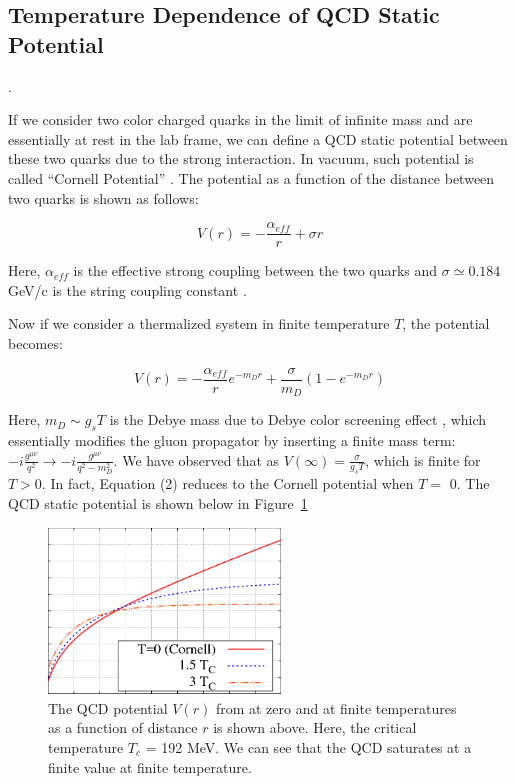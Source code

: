 \subsection{Temperature Dependence of QCD Static Potential}. 

If we consider two color charged quarks in the limit of infinite mass and are essentially at rest in the lab frame, we can define a QCD static potential between these two quarks due to the strong interaction. In vacuum, such potential is called ``Cornell Potential'' \cite{Cornell}. The potential as a function of the distance between two quarks is shown as follows:

\begin{equation}
V(r) = -\frac{\alpha_{eff}}{r} + \sigma r
\end{equation}

Here, $\alpha_{eff}$ is the effective strong coupling between the two quarks and $\sigma \simeq 0.184$ GeV/c is the string coupling constant \cite{CornellEquation}. 

Now if we consider a thermalized system in finite temperature $T$, the potential becomes: 

\begin{equation}
V(r) = -\frac{\alpha_{eff}}{r} e^{-m_D r} + \frac{\sigma}{m_D} (1 - e^{-m_D r})
\end{equation}

Here, $m_D \sim g_s T$ is the Debye mass due to Debye color screening effect \cite{CSEff}, which essentially modifies the gluon propagator by inserting a finite mass term: $-i \frac{g^{\mu\nu}}{q^2} \rightarrow -i \frac{g^{\mu\nu}}{q^2 - m_D^2}$. We have observed that as $V(\infty) = \frac{\sigma}{g_sT}$, which is finite for $T>$0. In fact, Equation (2) reduces to the Cornell potential when $T =$ 0. The QCD static potential is shown below in Figure~\ref{QCDPotential} \cite{TDepCornell}


\begin{figure}[hbtp]
\begin{center}
\includegraphics[width=0.55\textwidth]{Figures/Chapter1/QCDPotential.png}
\caption{The QCD potential $V(r)$ from at zero and at finite temperatures as a function of distance $r$ is shown above. Here, the critical temperature $T_c $ = 192 MeV. We can see that the QCD saturates at a finite value at finite temperature. }
\label{QCDPotential}
\end{center}
\end{figure} 


